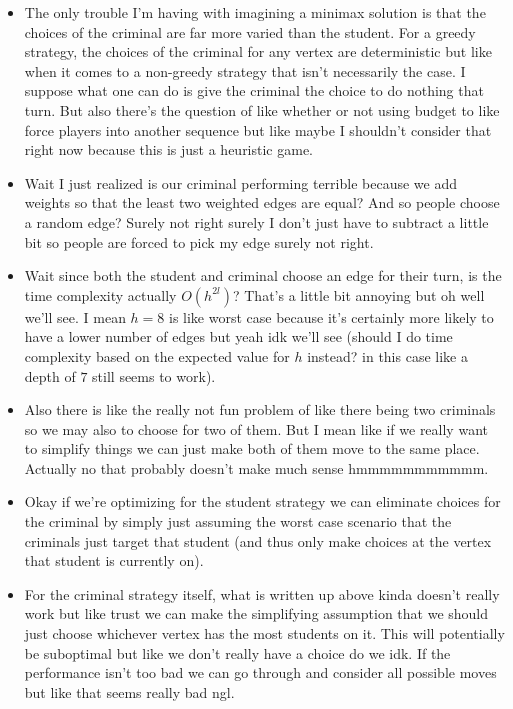 \documentclass[a4paper, 12pt]{article}
\begin{document}
\begin{itemize}
    \item The only trouble I'm having with imagining a minimax solution is that the choices of the criminal are far more varied than the student. For a greedy strategy, the choices of the criminal for any vertex are deterministic but like when it comes to a non-greedy strategy that isn't necessarily the case. I suppose what one can do is give the criminal the choice to do nothing that turn. But also there's the question of like whether or not using budget to like force players into another sequence but like maybe I shouldn't consider that right now because this is just a heuristic game.

    \item Wait I just realized is our criminal performing terrible because we add weights so that the least two weighted edges are equal? And so people choose a random edge? Surely not right surely I don't just have to subtract a little bit so people are forced to pick my edge surely not right.

    \item Wait since both the student and criminal choose an edge for their turn, is the time complexity actually \( O(h^{2l}) \)? That's a little bit annoying but oh well we'll see. I mean \( h = 8 \) is like worst case because it's certainly more likely to have a lower number of edges but yeah idk we'll see (should I do time complexity based on the expected value for \( h \) instead? in this case like a depth of \( 7 \) still seems to work).

    \item Also there is like the really not fun problem of like there being two criminals so we may also to choose for two of them. But I mean like if we really want to simplify things we can just make both of them move to the same place. Actually no that probably doesn't make much sense hmmmmmmmmmmm.

    \item Okay if we're optimizing for the student strategy we can eliminate choices for the criminal by simply just assuming the worst case scenario that the criminals just target that student (and thus only make choices at the vertex that student is currently on).

    \item For the criminal strategy itself, what is written up above kinda doesn't really work but like trust we can make the simplifying assumption that we should just choose whichever vertex has the most students on it. This will potentially be suboptimal but like we don't really have a choice do we idk. If the performance isn't too bad we can go through and consider all possible moves but like that seems really bad ngl.
\end{itemize}
\end{document}
